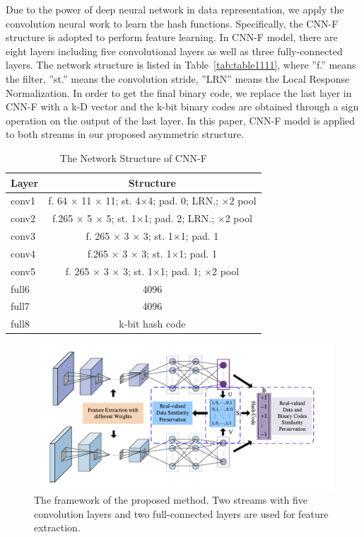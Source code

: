 \documentclass[12pt, a4paper,twoside]{article}
\begin{document}
Due to the power of deep neural network in data representation, we apply the convolution neural work to learn the hash functions. Specifically, the CNN-F structure is adopted to perform feature learning. In CNN-F model, there are eight layers including five convolutional layers as well as three fully-connected layers. The network structure is listed in Table~\ref{tab:table1111}, where ”f.” means the filter, ”st.” means the convolution stride, ”LRN” means the Local Response Normalization. In order to get the final binary code, we replace the last layer in CNN-F with a k-D vector and the k-bit binary codes are obtained through a sign operation on the output of the last layer. In this paper, CNN-F model is applied to both streams in our proposed asymmetric structure.


\begin{table}[]
\centering
\caption{The Network Structure of CNN-F}
\label{table1111}
\begin{tabular}{|l|c|}
\hline
Layer & Structure                                       \\ \hline
conv1 & f. 64 × 11 × 11; st. 4×4; pad. 0; LRN.; ×2 pool \\ \hline
conv2 & f.265 × 5 × 5; st. 1×1; pad. 2; LRN.; ×2 pool   \\ \hline
conv3 & f. 265 × 3 × 3; st. 1×1; pad. 1                 \\ \hline
conv4 & f.265 × 3 × 3; st. 1×1; pad. 1                  \\ \hline
conv5 & f. 265 × 3 × 3; st. 1×1; pad. 1; ×2 pool        \\ \hline
full6 & 4096                                            \\ \hline
full7 & 4096                                            \\ \hline
full8 & k-bit hash code                                 \\ \hline
\end{tabular}
\end{table}

\begin{figure}[htbp]
\centering
\includegraphics[scale=0.6]{images/cnnNetwork}
\caption{ The framework of the proposed method. Two streams with five convolution layers and two full-connected layers are used for feature extraction.
}\label{fig:figure111}
\end{figure} 
\end{document}
